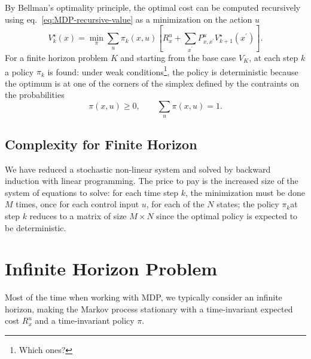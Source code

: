 By Bellman's optimality principle, the optimal cost can be computed recursively using eq.~\eqref{eq:MDP-recursive-value} as a minimization on the action $u$
\begin{equation*}
  V_k^\star(x) = \min_\pi \sum_u \pi_k(x,u)\left[R^u_x + \sum_{x^\prime}P_{x,x^\prime}^u V^\star_{k+1}(x^\prime)\right].
\end{equation*}
For a finite horizon problem $K$ and starting from the base case $V_K$, at each step $k$ a policy $\pi_k$ is found: under weak conditions\footnote{Which ones?}, the policy is deterministic because the optimum is at one of the corners of the simplex defined by the contraints on the probabilities
\begin{equation*}
  \pi(x,u) \ge 0,\qquad \sum_u \pi(x,u) = 1.
\end{equation*}

\subsection{Complexity for Finite Horizon}
\label{sec:MDP-complexity-finite-horizon}

We have reduced a stochastic non-linear system and solved by backward induction with linear programming. The price to pay is the increased size of the system of equations to solve: for each time step $k$, the minimization must be done $M$ times, once for each control input $u$, for each of the $N$ states; the policy $\pi_k$at step $k$ reduces to a matrix of size $M\times N$ since the optimal policy is expected to be deterministic.


\section{Infinite Horizon Problem}
\label{sec:MDP-infinite-horizon}

Most of the time when working with MDP, we typically consider an infinite horizon, making the Markov process stationary with a time-invariant expected cost $R_x^u$ and a time-invariant policy $\pi$.

